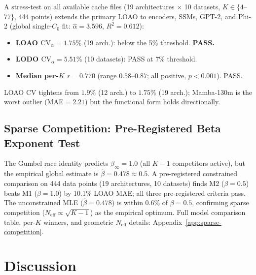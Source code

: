 \documentclass{article}
\begin{document}
A stress-test on all available cache files (19 architectures $\times$ 10 datasets, $K\in\{4$--$77\}$, 444 points) extends the primary LOAO to encoders, SSMs, GPT-2, and Phi-2 (global single-$C_0$ fit: $\hat\alpha=3.596$, $R^2=0.612$):
\begin{itemize}[nosep]
  \item \textbf{LOAO $\mathrm{CV}_\alpha=1.75\%$} (19 arch.): below the 5\% threshold. \textbf{PASS.}
  \item \textbf{LODO $\mathrm{CV}_\alpha=5.51\%$} (10 datasets): PASS at 7\% threshold.
  \item \textbf{Median per-$K$ $r=0.770$} (range $0.58$--$0.87$; all positive, $p<0.001$). PASS.
\end{itemize}
LOAO CV tightens from $1.9\%$ (12 arch.) to $1.75\%$ (19 arch.); Mamba-130m is the worst outlier (MAE$=2.21$) but the functional form holds directionally.

\subsection{Sparse Competition: Pre-Registered Beta Exponent Test}

The Gumbel race identity predicts $\beta_\infty=1.0$ (all $K-1$ competitors active), but
the empirical global estimate is $\hat\beta=0.478\approx0.5$.
A pre-registered constrained comparison on 444 data points (19 architectures, 10 datasets)
finds M2 ($\beta=0.5$) beats M1 ($\beta=1.0$) by 10.1\% LOAO MAE; all three pre-registered criteria pass.
The unconstrained MLE ($\hat\beta=0.478$) is within 0.6\% of $\beta=0.5$, confirming sparse
competition ($N_\mathrm{eff}\propto\sqrt{K-1}$) as the empirical optimum.
Full model comparison table, per-$K$ winners, and geometric $N_\mathrm{eff}$ details:
Appendix~\ref{app:sparse-competition}.

\section{Discussion}
\end{document}
